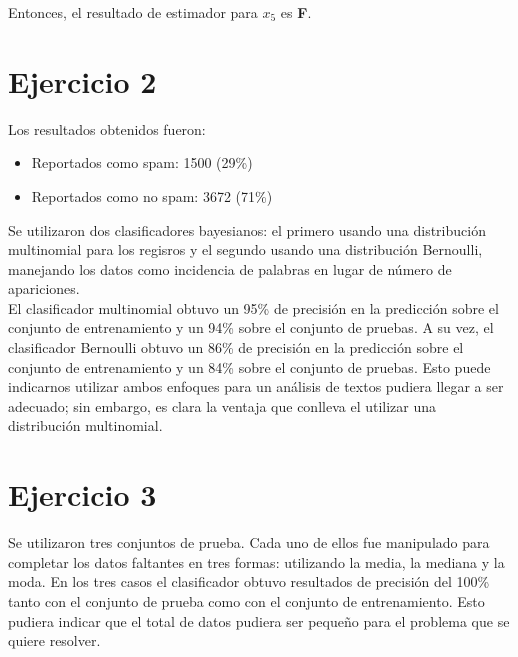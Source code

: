 \documentclass[letterpaper,12pt]{article}
\theoremstyle{definition}
\begin{document}
Entonces, el resultado de estimador para \(x_5\) es \textbf{F}.




\section*{Ejercicio 2}

Los resultados obtenidos fueron:\\

\begin{itemize}
  \item Reportados como spam: 1500 (29\%)
  \item Reportados como no spam: 3672 (71\%)
\end{itemize}
\medskip
Se utilizaron dos clasificadores bayesianos: el primero usando una distribución multinomial para los regisros y el segundo usando una distribución Bernoulli, manejando los datos como incidencia de palabras en lugar de número de apariciones.\\

El clasificador multinomial obtuvo un 95\% de precisión en la predicción sobre el conjunto de entrenamiento y un 94\% sobre el conjunto de pruebas. A su vez, el clasificador Bernoulli obtuvo un 86\% de precisión en la predicción sobre el conjunto de entrenamiento y un 84\% sobre el conjunto de pruebas. Esto puede indicarnos utilizar ambos enfoques para un análisis de textos pudiera llegar a ser adecuado; sin embargo, es clara la ventaja que conlleva el utilizar una distribución multinomial.

\section*{Ejercicio 3}

Se utilizaron tres conjuntos de prueba. Cada uno de ellos fue manipulado para completar los datos faltantes en tres formas: utilizando la media, la mediana y la moda. En los tres casos el clasificador obtuvo resultados de precisión del 100\% tanto con el conjunto de prueba como con el conjunto de entrenamiento. Esto pudiera indicar que el total de datos pudiera ser pequeño para el problema que se quiere resolver.
\end{document}
